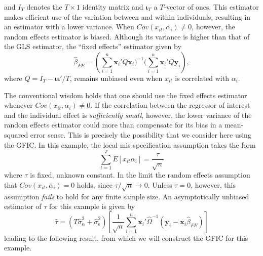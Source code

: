 and $I_T$ denotes the $T\times 1$ identity matrix and $\boldsymbol{\iota}_T$ a $T$-vector of ones.
This estimator makes efficient use of the variation between and within individuals, resulting in an estimator with a lower variance.
When $Cov(x_{it},\alpha_i)\neq 0$, however, the random effects estimator is biased. 
Although its variance is higher than that of the GLS estimator, the ``fixed effects'' estimator given by 
\begin{equation}
  \widehat{\beta}_{FE} = \left(\sum_{i=1}^{n} \mathbf{x}_i' Q \mathbf{x}_i\bigg)^{-1}\bigg(\sum_{i=1}^{n} \mathbf{x}_i' Q\mathbf{y}_i   \right),
  \label{eq:FEdef}
\end{equation}
where $Q=I_T - \boldsymbol{\iota}\boldsymbol{\iota}'/T$, remains unbiased even when $x_{it}$ is correlated with $\alpha_i$. 

The conventional wisdom holds that one should use the fixed effects estimator whenever $Cov(x_{it},\alpha_i)\neq 0$.
If the correlation between the regressor of interest and the individual effect is \emph{sufficiently small}, however, the lower variance of the random effects estimator could more than compensate for its bias in a mean-squared error sense.
This is precisely the possibility that we consider here using the GFIC.
In this example, the local mis-specification assumption takes the form
\begin{equation}
  \sum_{t=1}^T E\left[ x_{it}\alpha_i \right] = \frac{\tau}{\sqrt{n}}
  \label{eq:REvsFElocalmisp}
\end{equation}
where $\tau$ is fixed, unknown constant.
In the limit the random effects assumption that $Cov(x_{it},\alpha_i)=0$ holds, since $\tau/\sqrt{n} \rightarrow 0$.
Unless $\tau=0$, however, this assumption \emph{fails} to hold for any finite sample size.
An asymptotically unbiased estimator of $\tau$ for this example is given by
\begin{equation}
  \widehat{\tau}  =( T\widehat{\sigma}_\alpha^2 + \widehat{\sigma}_\epsilon^2) \left[\frac{1}{\sqrt{n}} \sum_{i=1}^n \mathbf{x}_i' \widehat{\Omega}^{-1} (\mathbf{y}_i - \mathbf{x}_i \widehat{\beta}_{FE})\right]
  \label{eq:REvsFEtau}
\end{equation}
leading to the following result, from which we will construct the GFIC for this example.

